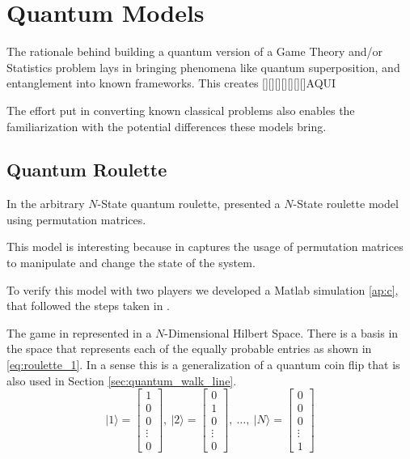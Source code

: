 \clearpage
\section{Quantum Models}
\label{sec:quantum_models}

The rationale behind building a quantum version of a Game Theory and/or Statistics problem lays in bringing phenomena like quantum superposition, and entanglement into known frameworks. This creates [][][][][][][]AQUI

The effort put in converting known classical problems also enables the familiarization with the potential differences these models bring.

\subsection{Quantum Roulette}
\label{subsec:quantum_roulette}

In the arbitrary $N$-State quantum roulette,\cite{Salimi2009} presented a $N$-State roulette model using permutation matrices. 

This model is interesting because in captures the usage of permutation matrices to manipulate and change the state of the system.

To verify this model with two players we developed a Matlab simulation \ref{ap:c}, that followed the steps taken in \cite{Salimi2009}.

The game in represented in a $N$-Dimensional Hilbert Space. There is a basis in the space that represents each of the equally probable entries as shown in \ref{eq:roulette_1}. In a sense this is a generalization of a quantum coin flip that is also used in Section \ref{sec:quantum_walk_line}.
\begin{equation}
\label{eq:roulette_1}
\vert1\rangle=\left[\begin{array}{c}
1\\
0\\
0\\
\vdots\\
0
\end{array}\right],\:\vert2\rangle=\left[\begin{array}{c}
0\\
1\\
0\\
\vdots\\
0
\end{array}\right],\:\ldots,\:\vert N\rangle=\left[\begin{array}{c}
0\\
0\\
0\\
\vdots\\
1
\end{array}\right]
\end{equation}

